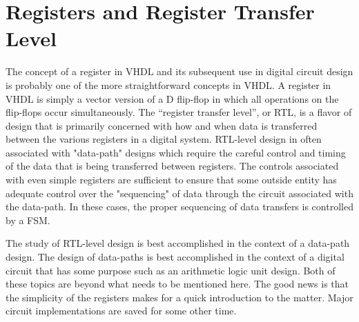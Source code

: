 %
%
%
\chapter{Registers and Register Transfer Level}
The concept of a register in VHDL and its subsequent use in digital circuit design is probably one of the more straightforward concepts in VHDL. A register in VHDL is simply a vector version of a D flip-flop in which all operations on the flip-flops occur simultaneously. The ``register transfer level'', or RTL, is a flavor of design that is primarily concerned with how and when data is transferred between the various registers in a digital system. RTL-level design in often associated with "data-path" designs which require the careful control and timing of the data that is being transferred between registers. The controls associated with even simple registers are sufficient to ensure that some outside entity has adequate control over the "sequencing" of data through the circuit associated with the data-path. In these cases, the proper sequencing of data transfers is controlled by a FSM. 

The study of RTL-level design is best accomplished in the context of a data-path design. The design of data-paths is best accomplished in the context of a digital circuit that has some purpose such as an arithmetic logic unit design. Both of these topics are beyond what needs to be mentioned here. The good news is that the simplicity of the registers makes for a quick introduction to the matter. Major circuit implementations are saved for some other time.

